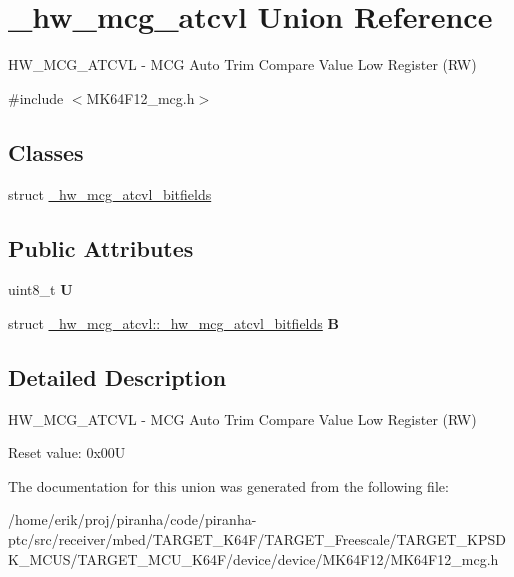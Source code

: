 \hypertarget{union__hw__mcg__atcvl}{}\section{\+\_\+hw\+\_\+mcg\+\_\+atcvl Union Reference}
\label{union__hw__mcg__atcvl}


H\+W\+\_\+\+M\+C\+G\+\_\+\+A\+T\+C\+VL -\/ M\+CG Auto Trim Compare Value Low Register (RW)  




{\ttfamily \#include $<$M\+K64\+F12\+\_\+mcg.\+h$>$}

\subsection*{Classes}
\begin{DoxyCompactItemize}
\item 
struct \hyperlink{struct__hw__mcg__atcvl_1_1__hw__mcg__atcvl__bitfields}{\+\_\+hw\+\_\+mcg\+\_\+atcvl\+\_\+bitfields}
\end{DoxyCompactItemize}
\subsection*{Public Attributes}
\begin{DoxyCompactItemize}
\item 
uint8\+\_\+t {\bfseries U}\hypertarget{union__hw__mcg__atcvl_aed71c3831f7fc8ef9103486b5e5a0102}{}\label{union__hw__mcg__atcvl_aed71c3831f7fc8ef9103486b5e5a0102}

\item 
struct \hyperlink{struct__hw__mcg__atcvl_1_1__hw__mcg__atcvl__bitfields}{\+\_\+hw\+\_\+mcg\+\_\+atcvl\+::\+\_\+hw\+\_\+mcg\+\_\+atcvl\+\_\+bitfields} {\bfseries B}\hypertarget{union__hw__mcg__atcvl_a934da8e759ceb6cb29865712f5b5d0a5}{}\label{union__hw__mcg__atcvl_a934da8e759ceb6cb29865712f5b5d0a5}

\end{DoxyCompactItemize}


\subsection{Detailed Description}
H\+W\+\_\+\+M\+C\+G\+\_\+\+A\+T\+C\+VL -\/ M\+CG Auto Trim Compare Value Low Register (RW) 

Reset value\+: 0x00U 

The documentation for this union was generated from the following file\+:\begin{DoxyCompactItemize}
\item 
/home/erik/proj/piranha/code/piranha-\/ptc/src/receiver/mbed/\+T\+A\+R\+G\+E\+T\+\_\+\+K64\+F/\+T\+A\+R\+G\+E\+T\+\_\+\+Freescale/\+T\+A\+R\+G\+E\+T\+\_\+\+K\+P\+S\+D\+K\+\_\+\+M\+C\+U\+S/\+T\+A\+R\+G\+E\+T\+\_\+\+M\+C\+U\+\_\+\+K64\+F/device/device/\+M\+K64\+F12/M\+K64\+F12\+\_\+mcg.\+h\end{DoxyCompactItemize}
